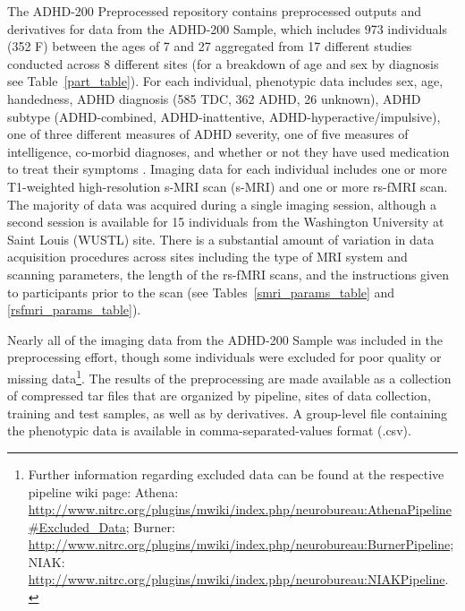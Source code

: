 \documentclass[preprint,12pt,3p]{elsarticle}
\begin{document}
The ADHD-200 Preprocessed repository contains preprocessed outputs and derivatives for data from the ADHD-200 Sample, which includes 973 individuals (352 F) between the ages of 7 and 27 aggregated from 17 different studies conducted across 8 different sites (for a breakdown of age and sex by diagnosis see Table~\ref{part_table}). For each individual, phenotypic data includes sex, age, handedness, ADHD diagnosis (585 TDC, 362 ADHD, 26 unknown), ADHD subtype (ADHD-combined, ADHD-inattentive, ADHD-hyperactive/impulsive), one of three different measures of ADHD severity, one of five measures of intelligence, co-morbid diagnoses, and whether or not they have used medication to treat their symptoms \cite{Milham2012}. Imaging data for each individual includes one or more T1-weighted high-resolution s-MRI scan (s-MRI) and one or more rs-fMRI scan. The majority of data was acquired during a single imaging session, although a second session is available for 15 individuals from the Washington University at Saint Louis (WUSTL) site. There is a substantial amount of variation in data acquisition procedures across sites including the type of MRI system and scanning parameters, the length of the rs-fMRI scans, and the instructions given to participants prior to the scan (see Tables~\ref{smri_params_table} and \ref{rsfmri_params_table}). 

Nearly all of the imaging data from the ADHD-200 Sample was included in the preprocessing effort, though some individuals were excluded for poor quality or missing data\footnote{Further information regarding excluded data can be found at the respective pipeline wiki page: Athena: \url{http://www.nitrc.org/plugins/mwiki/index.php/neurobureau:AthenaPipeline#Excluded_Data}; Burner: \url{http://www.nitrc.org/plugins/mwiki/index.php/neurobureau:BurnerPipeline}; NIAK: \url{http://www.nitrc.org/plugins/mwiki/index.php/neurobureau:NIAKPipeline}.}.
The results of the preprocessing are made available as a collection of compressed tar files that are organized by pipeline, sites of data collection, training and test samples, as well as by derivatives. A group-level file containing the phenotypic data is available in comma-separated-values format (.csv). 
\end{document}
